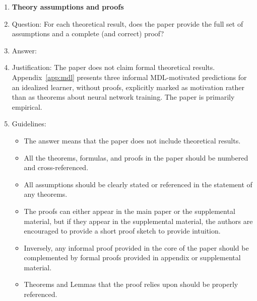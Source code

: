\documentclass{article}
\begin{document}
\begin{enumerate}
\begin{itemize}
        \item While the authors might fear that complete honesty about limitations might be used by reviewers as grounds for rejection, a worse outcome might be that reviewers discover limitations that aren't acknowledged in the paper. The authors should use their best judgment and recognize that individual actions in favor of transparency play an important role in developing norms that preserve the integrity of the community. Reviewers will be specifically instructed to not penalize honesty concerning limitations.
    \end{itemize}

\item {\bf Theory assumptions and proofs}
    \item[] Question: For each theoretical result, does the paper provide the full set of assumptions and a complete (and correct) proof?
    \item[] Answer: \answerNA{}
    \item[] Justification: The paper does not claim formal theoretical results. Appendix~\ref{app:mdl} presents three informal MDL-motivated predictions for an idealized learner, without proofs, explicitly marked as motivation rather than as theorems about neural network training. The paper is primarily empirical.
    \item[] Guidelines:
    \begin{itemize}
        \item The answer \answerNA{} means that the paper does not include theoretical results.
        \item All the theorems, formulas, and proofs in the paper should be numbered and cross-referenced.
        \item All assumptions should be clearly stated or referenced in the statement of any theorems.
        \item The proofs can either appear in the main paper or the supplemental material, but if they appear in the supplemental material, the authors are encouraged to provide a short proof sketch to provide intuition.
        \item Inversely, any informal proof provided in the core of the paper should be complemented by formal proofs provided in appendix or supplemental material.
        \item Theorems and Lemmas that the proof relies upon should be properly referenced.
    \end{itemize}


\end{enumerate}
\end{document}
